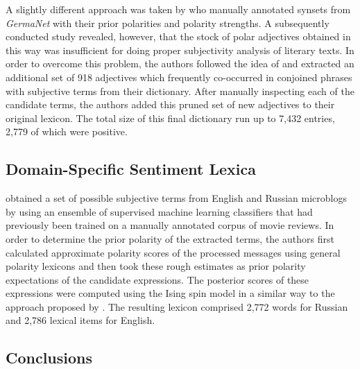 A slightly different approach was taken by \citet{Clematide:10} who
manually annotated synsets from \emph{GermaNet} \cite{Hamp:97} with
their prior polarities and polarity strengths.  A subsequently
conducted study revealed, however, that the stock of polar adjectives
obtained in this way was insufficient for doing proper subjectivity
analysis of literary texts.  In order to overcome this problem, the
authors followed the idea of \citet{Hatzivassi:97} and extracted an
additional set of 918 adjectives which frequently co-occurred in
conjoined phrases with subjective terms from their dictionary.  After
manually inspecting each of the candidate terms, the authors added
this pruned set of new adjectives to their original lexicon.  The
total size of this final dictionary run up to 7,432 entries, 2,779 of
which were positive.

\subsection{Domain-Specific Sentiment Lexica}

\citet{Chetviorkin:14} obtained a set of possible subjective terms
from English and Russian microblogs by using an ensemble of supervised
machine learning classifiers that had previously been trained on a
manually annotated corpus of movie reviews.  In order to determine the
prior polarity of the extracted terms, the authors first calculated
approximate polarity scores of the processed messages using general
polarity lexicons and then took these rough estimates as prior
polarity expectations of the candidate expressions.  The posterior
scores of these expressions were computed using the Ising spin model
in a similar way to the approach proposed by \citet{Takamura:05}.  The
resulting lexicon comprised 2,772 words for Russian and 2,786 lexical
items for English.


\subsection{Conclusions}
